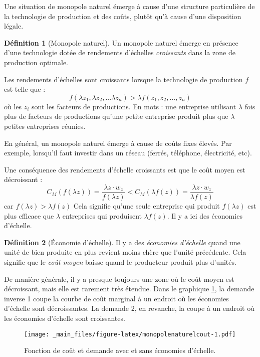 \documentclass[
]{book}
\theoremstyle{definition}
\newtheorem{definition}{Définition}[chapter]
\theoremstyle{definition}
\theoremstyle{definition}
\theoremstyle{definition}
\theoremstyle{remark}
\begin{document}
Une situation de monopole naturel émerge à cause d'une structure particulière de la technologie de production et des coûts, plutôt qu'à cause d'une disposition légale.

\begin{definition}[Monopole naturel]
Un monopole naturel émerge en présence d'une technologie dotée de rendements d'échelles \emph{croissants} dans la zone de production optimale.
\end{definition}

Les rendements d'échelles sont croissants lorsque la technologie de production \(f\) est telle que :
\[
f(\lambda z_1, \lambda z_2, ...\lambda z_n) > \lambda f(z_1,z_2, ..., z_n)
\]
où les \(z_i\) sont les facteurs de productions.
En mots : une entreprise utilisant \(\lambda\) fois plus de facteurs de productions qu'une petite entreprise produit plus que \(\lambda\) petites entreprises réunies.

En général, un monopole naturel émerge à cause de coûts fixes élevés.
Par exemple, lorsqu'il faut investir dans un réseau (ferrés, téléphone, électricité, etc).

Une conséquence des rendements d'échelle croissants est que le coût moyen est décroissant :
\[
C_M(f(\lambda z)) =\frac{\lambda z\cdot w_z}{f(\lambda z)} < C_M(\lambda f(z)) = \frac{\lambda z\cdot w_z}{\lambda f(z)}
\]
car \(f(\lambda z)>\lambda f(z)\)
Cela signifie qu'une seule entreprise qui produit \(f(\lambda z)\) est plus efficace que \(\lambda\) entreprises qui produisent \(\lambda f(z)\).
Il y a ici des économies d'échelle.

\begin{definition}[Économie d'échelle]
Il y a des \emph{économies d'échelle} quand une unité de bien produite en plus revient moins chère que l'unité précédente.
Cela signifie que le \emph{coût moyen} baisse quand le producteur produit plus d'unités.
\end{definition}

De manière générale, il y a presque toujours une zone où le coût moyen est décroissant, mais elle est rarement très étendue.
Dans le graphique \ref{fig:monopolenaturelcout}, la demande inverse 1 coupe la courbe de coût marginal à un endroit où les économies d'échelle sont décroissantes.
La demande 2, en revanche, la coupe à un endroit où les économies d'échelle sont croissantes.

\begin{figure}
\centering
\texttt{[image: \_main\_files/figure-latex/monopolenaturelcout-1.pdf]}
\caption{\label{fig:monopolenaturelcout}Fonction de coût et demande avec et sans économies d'échelle.}
\end{figure}
\end{document}
